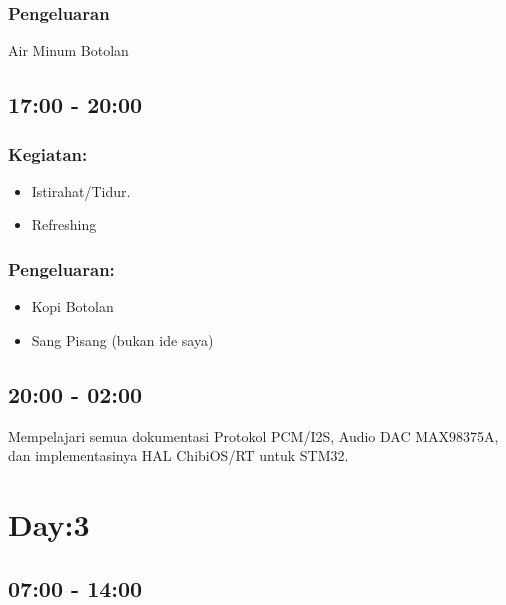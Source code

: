 \documentclass[12pt,]{article}
\begin{document}
	\subsubsection{Pengeluaran}
	Air Minum Botolan
	
	\newpage
	\subsection{17:00 - 20:00}
	\subsubsection{Kegiatan:}
	\begin{itemize}
		\item Istirahat/Tidur.
		\item Refreshing 
	\end{itemize}

	\subsubsection{Pengeluaran:}
	\begin{itemize}
		\item Kopi Botolan
		\item Sang Pisang (bukan ide saya)
	\end{itemize}

	\subsection{20:00 - 02:00}
	Mempelajari semua dokumentasi Protokol PCM/I2S, Audio DAC MAX98375A, dan implementasinya HAL ChibiOS/RT untuk STM32. 
	
	\newpage
	\section{Day:3}
	\subsection{07:00 - 14:00}
\end{document}
